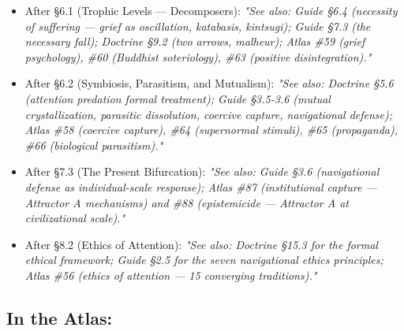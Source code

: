 \begin{itemize}[nosep,leftmargin=*]
  \item After §6.1 (Trophic Levels — Decomposers): \textit{"See also: Guide §6.4 (necessity of suffering — grief as oscillation, katabasis, kintsugi); Guide §7.3 (the necessary fall); Doctrine §9.2 (two arrows, malheur); Atlas \#59 (grief psychology), \#60 (Buddhist soteriology), \#63 (positive disintegration)."}
  \item After §6.2 (Symbiosis, Parasitism, and Mutualism): \textit{"See also: Doctrine §5.6 (attention predation formal treatment); Guide §3.5-3.6 (mutual crystallization, parasitic dissolution, coercive capture, navigational defense); Atlas \#58 (coercive capture), \#64 (supernormal stimuli), \#65 (propaganda), \#66 (biological parasitism)."}
  \item After §7.3 (The Present Bifurcation): \textit{"See also: Guide §3.6 (navigational defense as individual-scale response); Atlas \#87 (institutional capture — Attractor A mechanisms) and \#88 (epistemicide — Attractor A at civilizational scale)."}
  \item After §8.2 (Ethics of Attention): \textit{"See also: Doctrine §15.3 for the formal ethical framework; Guide §2.5 for the seven navigational ethics principles; Atlas \#56 (ethics of attention — 15 converging traditions)."}
\end{itemize}


\subsection*{In the Atlas:}


